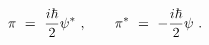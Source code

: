 \begin{equation}
\pi \ =\ {\frac{i\hbar }{2}}\psi ^{\ast }\ ,\qquad \pi ^{\ast }\ =\ -{\frac{%
i\hbar }{2}}\psi \ .  \label{momentaHT}
\end{equation}%
